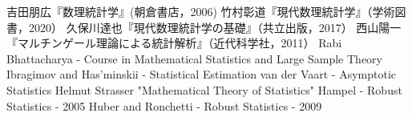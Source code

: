 \documentclass[uplatex,dvipdfmx]{jsreport}
\begin{document}
\begin{thebibliography}{99}
    吉田朋広『数理統計学』(朝倉書店，2006)
    竹村彰道『現代数理統計学』（学術図書，2020）
    久保川達也『現代数理統計学の基礎』（共立出版，2017）
    西山陽一『マルチンゲール理論による統計解析』（近代科学社，2011）
    Rabi Bhattacharya - Course in Mathematical Statistics and Large Sample Theory
    Ibragimov and Has'minskii - Statistical Estimation
    van der Vaart - Asymptotic Statistics
    Helmut Strasser "Mathematical Theory of Statistics"
    Hampel - Robust Statistics - 2005
    Huber and Ronchetti - Robust Statistics - 2009
\end{thebibliography}
\end{document}
